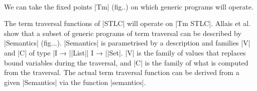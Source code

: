 \documentclass[sigplan,review,fleqn]{acmart}
\renewcommand{\verb}{\collectverb{\color{AgdaFunction}}}
\newcommand{\name}{\collectverb{\color{AgdaSymbol}}}
\begin{document}
\begin{code}
\AgdaInductiveConstructor{[]}\AgdaSpace{}%
\AgdaSymbol{(}\AgdaSpace{}%
\AgdaSpace{}%
\AgdaSymbol{)}\AgdaSpace{}%
\AgdaSymbol{(}\AgdaSpace{}%
\AgdaInductiveConstructor{[]}\AgdaSpace{}%
\AgdaSpace{}%
\AgdaSymbol{(}\AgdaSpace{}%
\AgdaSymbol{))}\<%
\\
%
\>[2]\AgdaSymbol{(}\AgdaSpace{}%
\AgdaSpace{}%
\AgdaSymbol{)}\AgdaSpace{}%
\AgdaSpace{}%
\AgdaSpace{}%
\AgdaSymbol{(}\AgdaSpace{}%
\AgdaSpace{}%
\AgdaInductiveConstructor{[]}\AgdaSymbol{)}\AgdaSpace{}%
\AgdaSpace{}%
\AgdaSymbol{(}\AgdaSpace{}%
\AgdaSymbol{(}\AgdaSpace{}%
\AgdaSpace{}%
\AgdaSymbol{))}\<%
\end{code}
We can take the fixed points \verb|Tm| (fig..) on which generic programs will operate.
\begin{code}
	\>[0]\AgdaSpace{}%
	\AgdaSpace{}%
	\AgdaSymbol{(}\AgdaSpace{}%
	\AgdaSymbol{:}\AgdaSpace{}%
	\AgdaSpace{}%
	\AgdaSymbol{)}\AgdaSpace{}%
	\AgdaSymbol{:}\AgdaSpace{}%
	\AgdaSpace{}%
	\AgdaSpace{}%
	\AgdaSpace{}%
	\AgdaSpace{}%
	\AgdaSpace{}%
	\AgdaSpace{}%
	\<%
\end{code}
The term traversal functions of \verb|STLC| will operate on \verb|Tm STLC|.
Allais et al. show that a subset of generic programs of term traversal can be described by \verb|Semantics| (fig...).
\verb|Semantics| is parametrised by a description and families \name|V| and \name|C| of type \name|I → |\verb|List|\name| I → |\verb|Set|.
\name|V| is the family of values that replaces bound variables during the traversal, and \name|C| is the family of what is computed from the traversal.
The actual term traversal function can be derived from a given \verb|Semantics| via the function \verb|semantics|.
\end{document}
